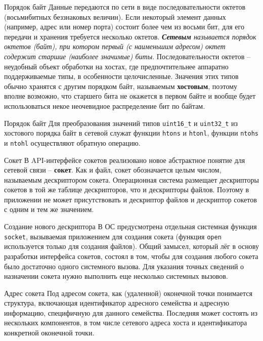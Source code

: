 \begin{frame}{Порядок байт}
Данные передаются по сети в виде последовательности октетов (восьмибитных беззнаковых величин). Если некоторый элемент данных (например, адрес или номер порта) состоит более чем из восьми бит, для его передачи и хранения требуется несколько октетов. 
{\itshape {\bfseries Сетевым} называется порядок октетов (байт), при котором первый (с наименьшим адресом) октет содержит старшие (наиболее значимые) биты}. 
\pause
Последовательности октетов -- неудобный объект обработки на хостах, где предпочтительнее аппаратно поддерживаемые типы, в особенности целочисленные. Значения этих типов обычно хранятся с другим порядком байт, называемым {\bfseries хостовым}, поэтому вполне возможно, что старшего бита не окажется в первом байте и вообще будет использоваться некое неочевидное распределение бит по байтам. 
\end{frame}

\begin{frame}{Порядок байт}
Для преобразования значений типов {\tt uint16\_t} и {\tt uint32\_t} из хостового порядка байт в сетевой служат функции {\tt htons} и {\tt htonl}, функции {\tt ntohs} и {\tt ntohl} осуществляют обратную операцию. 
\end{frame}

\begin{frame}{Сокет}
В API-интерфейсе сокетов реализовано новое абстрактное понятие для сетевой связи -- {\bf сокет}. Как и файл,  сокет обозначается целым числом,  называемым дескриптором сокета. Операционная система размещает дескрипторы сокетов в той же таблице дескрипторов,  что и дескрипторы файлов. Поэтому в приложении не может присутствовать и дескриптор файлов и дескриптор сокетов с одним и тем же значением.
\end{frame}

\begin{frame}{Создание нового дескриптора}
В ОС предусмотрена отдельная системная функция {\tt socket},  вызываемая приложением для создания 
сокета (функция {\tt open} используется только для создания файлов). Общий замысел,  
который лёг в основу разработки интерфейса сокетов,  состоял в том,  чтобы для создания любого сокета
было достаточно одного системного вызова. Для указания точных сведений о назначении сокета
нужно выполнить еще несколько системных вызовов.
\end{frame}

\begin{frame}{Адрес сокета}
Под адресом сокета, как (удаленной) оконечной точки понимается структура, включающая идентификатор адресного семейства и адресную информацию, специфичную для данного семейства. Последняя может состоять из нескольких компонентов, в том числе сетевого адреса хоста и идентификатора конкретной оконечной точки. 
\end{frame}


